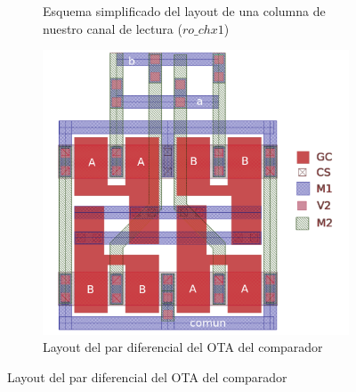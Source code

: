 \begin{figure}[h]
	\centering
	\begin{subfigure}{0.45\textwidth}
		
		\caption{Esquema simplificado del layout de una columna de nuestro canal de lectura ($ro\_chx1$)}
		\label{fig:ro_chx1}
	\end{subfigure}
	\qquad %
	\begin{subfigure}{0.45\textwidth}
		\includegraphics[width=\textwidth]{img/OTA_simple_layout.png}
		\caption{Layout del par diferencial del OTA del comparador}
		\label{fig:ota_simple_layout}
	\end{subfigure}
\end{figure}
